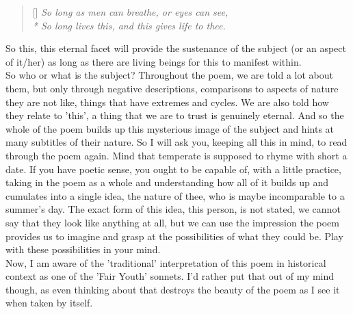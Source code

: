 \documentclass[]{article}
\begin{document}
\begin{verse}[\versewidth]
	\itshape
	So long as men can breathe, or eyes can see,\\*
	So long lives this, and this gives life to thee.\\
\end{verse}

So this, this eternal facet will provide the sustenance of the subject (or an aspect of it/her) as long as there are living beings for this to manifest within.\\

So who or what is the subject? Throughout the poem, we are told a lot about them, but only through negative descriptions, comparisons to aspects of nature they are not like, things that have extremes and cycles. We are also told how they relate to 'this', a thing that we are to trust is genuinely eternal. And so the whole of the poem builds up this mysterious image of the subject and hints at many subtitles of their nature. So I will ask you, keeping all this in mind, to read through the poem again. Mind that temperate is supposed to rhyme with short a date. If you have poetic sense, you ought to be capable of, with a little practice, taking in the poem as a whole and understanding how all of it builds up and cumulates into a single idea, the nature of thee, who is maybe incomparable to a summer's day. The exact form of this idea, this person, is not stated, we cannot say that they look like anything at all, but we can use the impression the poem provides us to imagine and grasp at the possibilities of what they could be. Play with these possibilities in your mind.\\

Now, I am aware of the 'traditional' interpretation of this poem in historical context as one of the 'Fair Youth' sonnets. I'd rather put that out of my mind though, as even thinking about that destroys the beauty of the poem as I see it when taken by itself.
\end{document}
